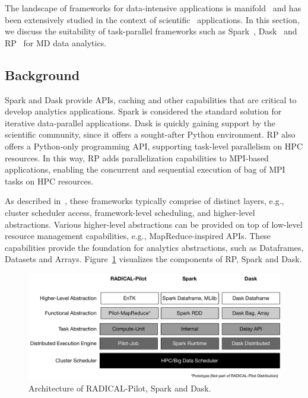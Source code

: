 The landscape of frameworks for data-intensive applications is
manifold~\cite{jha2014tale,kamburugamuve2017anatomy} and has been extensively
studied in the context of scientific~\cite{jha2017introducing} applications. In
this section, we discuss the suitability of task-parallel frameworks such as
Spark~\cite{zaharia2010spark}, Dask~\cite{rocklin2015dask} and
RP~\cite{merzky2019using} for MD data analytics.

\subsection{Background}

Spark and Dask provide APIs, caching and other capabilities that are critical to
develop analytics applications. Spark is considered the standard solution for
iterative data-parallel applications. Dask is quickly gaining support by
the scientific community, since it offers a sought-after Python environment.
RP also offers a Python-only programming API, supporting task-level
parallelism on HPC resources. In this way, RP adds parallelization
capabilities to MPI-based applications, enabling the concurrent and sequential
execution of bag of MPI tasks on HPC resources.

As described in~\cite{jha2014tale}, these frameworks typically comprise of
distinct layers, e.g., cluster scheduler access, framework-level scheduling, and
higher-level abstractions. Various higher-level abstractions can be provided on
top of low-level resource management capabilities, e.g., MapReduce-inspired
APIs. These capabilities provide the foundation for analytics abstractions, such
as Dataframes, Datasets and Arrays.
Figure~\ref{fig:figures_bigdata_framework_stack} visualizes the components of
RP, Spark and Dask.

\begin{figure}[ht]
    \centering
    \includegraphics[width=.95\textwidth]{figures/data_analytics_hpc/task_par/bigdata_framework_stack.pdf}
    \caption{Architecture of RADICAL-Pilot, Spark and Dask.}
    \label{fig:figures_bigdata_framework_stack}
\end{figure}

